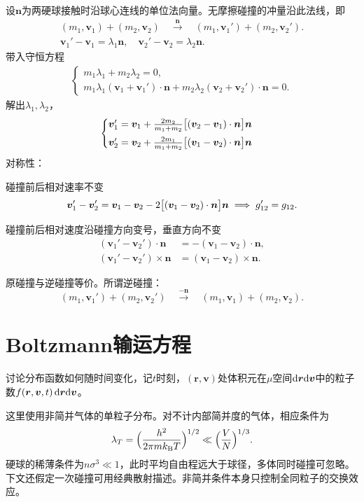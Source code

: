 设$\bm n$为两硬球接触时沿球心连线的单位法向量。无摩擦碰撞的冲量沿此法线，即
\begin{gather*}
	(m_1,\bm v_1) + (m_2,\bm v_2)\quad\overset{\bm n}{\longrightarrow}\quad(m_1,\bm v_1') + (m_2,\bm v_2').\\
	\bm v_1' - \bm v_1 = \lambda_1\bm n,\quad\bm v_2' - \bm v_2 = \lambda_2\bm n.
\end{gather*}
带入守恒方程
\begin{align*}
	\begin{cases}
		m_1\lambda_1 + m_2\lambda_2 = 0,\\
		m_1\lambda_1(\bm v_1 + \bm v_1') \cdot \bm n + m_2\lambda_2(\bm v_2 + \bm v_2') \cdot \bm n = 0.
	\end{cases}
\end{align*}
解出$\lambda_1,\lambda_2$，
\begin{align}
	\begin{cases}
		\bm v_1' = \bm v_1 + \frac{2m_2}{m_1 + m_2}\bigl[(\bm v_2 - \bm v_1) \cdot \bm n\bigr]\bm n\\[1ex]
		\bm v_2' = \bm v_2 + \frac{2m_1}{m_1 + m_2}\bigl[(\bm v_1 - \bm v_2) \cdot \bm n\bigr]\bm n
	\end{cases}
\end{align}
对称性：
\begin{compactenum}
	\item 碰撞前后相对速率不变
	\[
		\bm v_1' - \bm v_2' = \bm v_1 - \bm v_2 - 2\bigl[(\bm v_1 - \bm v_2) \cdot \bm n\bigr]\bm n \implies g_{12}' = g_{12}.
	\]
	\item 碰撞前后相对速度沿碰撞方向变号，垂直方向不变
	\begin{align*}
		(\bm v_1' - \bm v_2') \cdot \bm n &= -(\bm v_1 - \bm v_2) \cdot \bm n,\\
		(\bm v_1' - \bm v_2') \times \bm n &= (\bm v_1 - \bm v_2) \times \bm n.
	\end{align*}
	\item 原碰撞与逆碰撞等价。所谓逆碰撞：
	\[
		(m_1,\bm v_1') + (m_2,\bm v_2')\quad\overset{-\bm n}{\longrightarrow}\quad(m_1,\bm v_1) + (m_2,\bm v_2).
	\]
\end{compactenum}
\section{Boltzmann输运方程}
讨论分布函数如何随时间变化，记$t$时刻，$(\bm r,\bm v)$处体积元在$\mu$空间$\mathop{}\!\mathrm{d}\bm r\mathrm{d}\bm v$中的粒子数$f(\bm r,\bm v,t)\mathop{}\!\mathrm{d}\bm r\mathrm{d}\bm v$。

这里使用非简并气体的单粒子分布。对不计内部简并度的气体，相应条件为
\begin{equation}
	\label{eq:sm-classical-diluteness}
	\lambda_T = \Bigl(\frac{h^2}{2\pi mk_{\mathrm{B}} T}\Bigr)^{1/2} \ll \Bigl(\frac VN\Bigr)^{1/3}.
\end{equation}
硬球的稀薄条件为$n\sigma^3 \ll 1$，此时平均自由程远大于球径，多体同时碰撞可忽略。下文还假定一次碰撞可用经典散射描述。非简并条件本身只控制全同粒子的交换效应。

